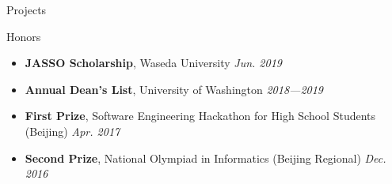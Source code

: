 \documentclass{resume}
\begin{document}
\begin{rSection}{Projects}




	\end{rSection}
	\vspace{-5pt}
	

	\begin{rSection}{Honors}
		\begin{itemize}
			\setlength{\itemsep}{1pt}
			\setlength{\parskip}{0pt}
			\setlength{\parsep}{0pt}
			\item \textbf{JASSO Scholarship}, Waseda University \hfill {\em Jun. 2019}
			\item \textbf{Annual Dean's List}, University of Washington \hfill {\em 2018---2019}
			\item \textbf{First Prize}, Software Engineering Hackathon for High School Students (Beijing) \hfill {\em Apr. 2017}
			\item \textbf{Second Prize}, National Olympiad in Informatics (Beijing Regional) \hfill {\em Dec. 2016}
		\end{itemize}
	\end{rSection}
\end{document}
